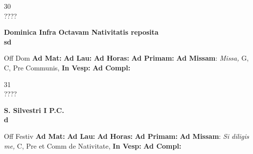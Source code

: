 \documentclass[10pt, openany]{book}
\begin{document}
    \begin{center}
        \begin{minipage}{3.5in}
            \vspace{2em}
            \begin{minipage}{0.5in}
                {\Huge 30} \\
                {\normalsize ????}
            \end{minipage}
            \begin{minipage}{3.0in}
                \textbf{ \large Dominica Infra Octavam Nativitatis reposita \\
                \textnormal{\normalsize sd}}

            \end{minipage}
            \begin{justify}Off Dom
                \textbf{Ad Mat: }
                \textbf{Ad Lau: }
                \textbf{Ad Horas: }
                \textbf{Ad Primam: }\textbf{Ad Missam}: \textit{Missa,} G, C, Pre Communis, 
                \textbf{In Vesp: }
                \textbf{Ad Compl: }
            \end{justify}
        \end{minipage}
    \end{center}

    \begin{center}
        \begin{minipage}{3.5in}
            \vspace{2em}
            \begin{minipage}{0.5in}
                {\Huge 31} \\
                {\normalsize ????}
            \end{minipage}
            \begin{minipage}{3.0in}
                \textbf{ \large S. Silvestri I P.C. \\
                \textnormal{\normalsize d}}

            \end{minipage}
            \begin{justify}Off Festiv
                \textbf{Ad Mat: }
                \textbf{Ad Lau: }
                \textbf{Ad Horas: }
                \textbf{Ad Primam: }\textbf{Ad Missam}: \textit{Si diligis me,} C, Pre et Comm de Nativitate, 
                \textbf{In Vesp: }
                \textbf{Ad Compl: }
            \end{justify}
        \end{minipage}
    \end{center}
\end{document}

